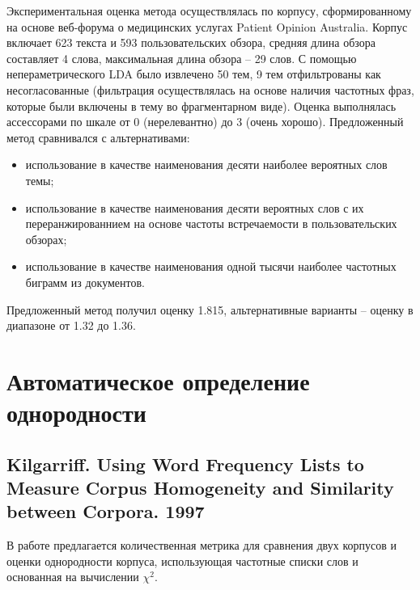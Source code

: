 Экспериментальная оценка метода осуществлялась по корпусу, сформированному на основе веб-форума о медицинских услугах Patient Opinion Australia. Корпус включает 623 текста и 593 пользовательских обзора, средняя длина обзора составляет 4 слова, максимальная длина обзора -- 29 слов. С помощью непераметрического LDA было извлечено 50 тем, 9 тем отфильтрованы как несогласованные (фильтрация осуществлялась на основе наличия частотных фраз, которые были включены в тему во фрагментарном виде). Оценка выполнялась ассессорами по шкале от 0 (нерелевантно) до 3 (очень хорошо). Предложенный метод сравнивался с альтернативами: 
\begin{itemize}
    \item использование в качестве наименования десяти наиболее вероятных слов темы;
    \item использование в качестве наименования десяти вероятных слов с их переранжированнием на основе частоты встречаемости в пользовательских обзорах;
    \item использование в качестве наименования одной тысячи наиболее частотных биграмм из документов.
\end{itemize} 
\noindent Предложенный метод получил оценку 1.815, альтернативные варианты -- оценку в диапазоне от 1.32 до 1.36.

 






\chapter{Автоматическое определение однородности}

\section{Kilgarriff. Using Word Frequency Lists to Measure Corpus Homogeneity and Similarity between Corpora. 1997}

В работе предлагается количественная метрика для сравнения двух корпусов и оценки однородности корпуса, использующая частотные списки слов и основанная на вычислении $\chi^2$.

